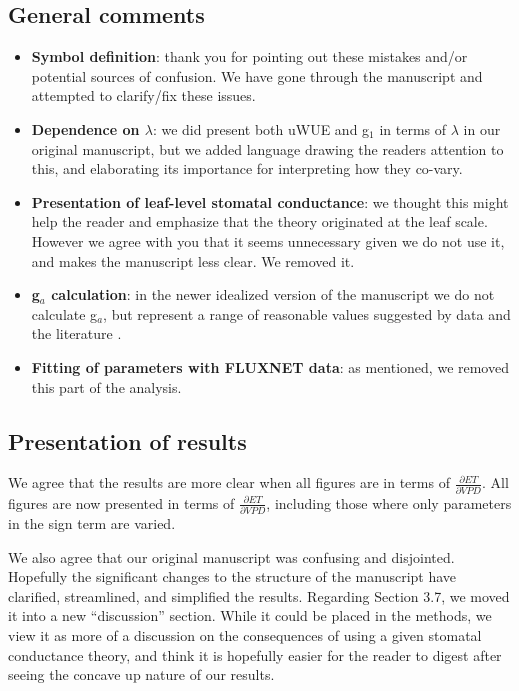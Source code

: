 \documentclass[12pt]{article}
\begin{document}
\subsection{General comments}

\begin{itemize}
  \item \textbf{Symbol definition}: thank you for pointing out these mistakes
    and/or potential sources of confusion. We have gone through the
    manuscript and attempted to clarify/fix these issues.
  \item \textbf{Dependence on $\lambda$}: we did present both uWUE and g$_1$ in
    terms of $\lambda$ in our original manuscript, but we added
    language drawing the readers attention to this, and elaborating
    its importance for interpreting how they co-vary.
  \item \textbf{Presentation of leaf-level stomatal conductance}: we
    thought this might help the reader and emphasize that the theory
    originated at the leaf scale. However we agree with you that it
    seems unnecessary given we do not use it, and makes the manuscript
    less clear. We removed it.
  \item \textbf{g$_a$ calculation}: in the newer idealized version of
    the manuscript we do not calculate g$_a$, but represent a range of
    reasonable values suggested by data and the literature
    \citep[e.g.,][]{Raupach_1995}.
  \item \textbf{Fitting of parameters with FLUXNET data}: as
    mentioned, we removed this part of the analysis.
\end{itemize}

\subsection{Presentation of results}

We agree that the results are more clear when all figures are in terms
of $\frac{\partial ET}{\partial VPD}$. All figures are now presented
in terms of $\frac{\partial ET}{\partial VPD}$, including those where
only parameters in the sign term are varied.

We also agree that our original manuscript was confusing and
disjointed. Hopefully the significant changes to the structure of the
manuscript have clarified, streamlined, and simplified the
results. Regarding Section 3.7, we moved it into a new ``discussion''
section. While it could be placed in the methods, we view it as more
of a discussion on the consequences of using a given stomatal
conductance theory, and think it is hopefully easier for the reader to
digest after seeing the concave up nature of our results.
\end{document}
